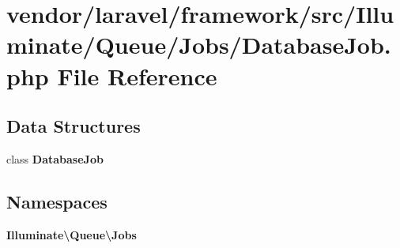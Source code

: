 \section{vendor/laravel/framework/src/\+Illuminate/\+Queue/\+Jobs/\+Database\+Job.php File Reference}
\label{_database_job_8php}
\subsection*{Data Structures}
\begin{DoxyCompactItemize}
\item 
class {\bf Database\+Job}
\end{DoxyCompactItemize}
\subsection*{Namespaces}
\begin{DoxyCompactItemize}
\item 
 {\bf Illuminate\textbackslash{}\+Queue\textbackslash{}\+Jobs}
\end{DoxyCompactItemize}
